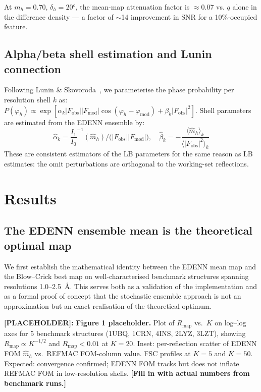 \documentclass[10pt,twocolumn]{article}
\newcommand{\placeholder}[1]{%
  \begin{mdframed}[
    linecolor=placeholder,linewidth=1pt,
    backgroundcolor=red!5,
    innertopmargin=6pt,innerbottommargin=6pt,
    innerleftmargin=8pt,innerrightmargin=8pt]
  \small\color{placeholder}\textbf{[PLACEHOLDER]:} #1
  \end{mdframed}
}
\newcommand{\Fobs}{F_{\!\mathrm{obs}}}
\newcommand{\Fmod}{F_{\!\mathrm{mod}}}
\newcommand{\phimod}{\varphi_{\mathrm{mod}}}
\newcommand{\phih}{\varphi_h}
\newcommand{\mh}{m_h}
\begin{document}
\noindent At $\mh=0.70$, $\delta_h=20°$, the mean-map attenuation
factor is $\approx 0.07$ vs. $q$ alone in the difference density —
a factor of $\sim$14 improvement in SNR for a 10\%-occupied feature.

\subsection{Alpha/beta shell estimation and Lunin connection}

Following Lunin \& Skovoroda~\cite{lunin1995}, we parameterise
the phase probability per resolution shell $k$ as:
$P(\phih) \propto \exp[\alpha_k|\Fobs||\Fmod|\cos(\phih-\phimod)
+ \beta_k|\Fobs|^2]$.
Shell parameters are estimated from the EDENN ensemble by:
\begin{equation}
  \hat\alpha_k = \frac{I_1}{I_0}^{-1}(\hat m_h)\Big/
    \bigl(|\Fobs||\Fmod|\bigr),\quad
  \hat\beta_k = -\frac{\langle \hat m_h\rangle_k}
    {\langle|\Fobs|^2\rangle_k}
  \label{eq:alpha_beta}
\end{equation}
These are consistent estimators of the LB parameters for the
same reason as LB estimates: the omit perturbations are
orthogonal to the working-set reflections.

\section{Results}

\subsection{The EDENN ensemble mean is the theoretical optimal map}

We first establish the mathematical identity between the EDENN mean
map and the Blow--Crick best map on well-characterised benchmark
structures spanning resolutions 1.0--2.5~\AA.
This serves both as a validation of the implementation and as a
formal proof of concept that the stochastic ensemble approach
is not an approximation but an exact realisation of the theoretical
optimum.

\placeholder{
\textbf{Figure 1 placeholder.}
Plot of $R_{\mathrm{map}}$ vs.\ $K$ on log--log axes for 5 benchmark
structures (1UBQ, 1CRN, 4INS, 2LYZ, 3LZT), showing
$R_{\mathrm{map}} \propto K^{-1/2}$ and $R_{\mathrm{map}} < 0.01$
at $K=20$.
Inset: per-reflection scatter of EDENN FOM $\hat m_h$ vs.\
REFMAC FOM-column value.
FSC profiles at $K=5$ and $K=50$.
Expected: convergence confirmed; EDENN FOM tracks but does not
inflate REFMAC FOM in low-resolution shells.
\textbf{[Fill in with actual numbers from benchmark runs.]}
}
\end{document}
